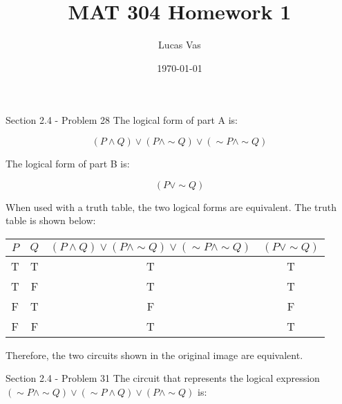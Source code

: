 \documentclass[12pt]{article}
\begin{document}
\title{MAT 304 Homework 1}
\date{\today}
\author{Lucas Vas}

\maketitle

\begin{problem}{Section 2.4 - Problem 28}
The logical form of part A is:

\begin{equation*}
	(P \wedge Q) \vee (P \wedge \sim Q) \vee (\sim P \wedge \sim Q)
\end{equation*}

The logical form of part B is:

\begin{equation*}
	(P \vee \sim Q)
\end{equation*}

When used with a truth table, the two logical forms are equivalent. The truth table is shown below:

\begin{center}
	\begin{tabular}{| c c | c | c |}
		\hline
		$P$ & $Q$ & $(P \wedge Q) \vee (P \wedge \sim Q) \vee (\sim P \wedge \sim Q)$ & $(P \vee \sim Q)$ \\
		\hline
		T   & T   & T                                                                 & T                 \\
		T   & F   & T                                                                 & T                 \\
		F   & T   & F                                                                 & F                 \\
		F   & F   & T                                                                 & T                 \\
		\hline
	\end{tabular}
\end{center}

Therefore, the two circuits shown in the original image are equivalent.

\end{problem}

\begin{problem}{Section 2.4 - Problem 31}
The circuit that represents the logical expression $(\sim P \wedge \sim Q) \vee (\sim P \wedge Q) \vee (P \wedge \sim Q)$ is:
\begin{center}
	
\end{center}
\end{problem}
\end{document}
